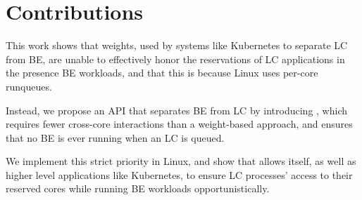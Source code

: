 \section{Contributions}

This work shows that \cgroups{} weights, used by systems like Kubernetes to
separate LC from BE, are unable to effectively honor the reservations of LC
applications in the presence BE workloads, and that this is because Linux uses
per-core runqueues. 

Instead, we propose an API that separates BE from LC by introducing \beclass{},
which requires fewer cross-core interactions than a weight-based approach, and
ensures that no BE is ever running when an LC is queued.

We implement this strict priority in Linux, and show that \beclass{} allows
\cgroups{} itself, as well as higher level applications like Kubernetes, to
ensure LC processes' access to their reserved cores while running BE workloads
opportunistically.
